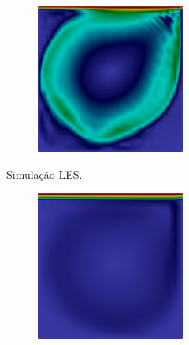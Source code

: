 \begin{figure}[h!]
\begin{subfigure}{\textwidth}
\begin{subfigure}{\textwidth}
\begin{subfigure}{.32\textwidth}
            \end{subfigure}
            \begin{subfigure}{.32\textwidth}
                \includegraphics[width=\linewidth]{Figuras/cavity-poor/LES-TH.png}
            \end{subfigure}
            \caption{Simulação LES.}
        \end{subfigure}
        \begin{subfigure}{\textwidth}\centering
            \begin{subfigure}{.32\textwidth}
                \includegraphics[width=\linewidth]{Figuras/cavity-poor/VMS-Lin.png}

\end{subfigure}
\end{subfigure}
\end{subfigure}
\end{figure}
